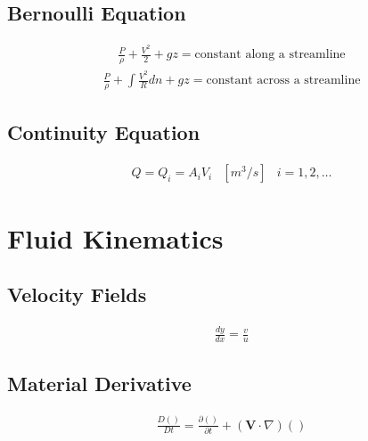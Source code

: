 \documentclass[a4paper]{amsart}
\begin{document}
\subsection{Bernoulli Equation}
\begin{eqnarray*}
	\frac{P}{\rho}+\frac{V^2}{2}+gz=\text{constant along a streamline}
\end{eqnarray*}
\begin{eqnarray*}
	\frac{P}{\rho}+\int\frac{V^2}{R}dn+gz=\text{constant across a streamline}
\end{eqnarray*}
\subsection{Continuity Equation}
\begin{eqnarray*}
	Q=Q_i=A_iV_i&[m^3/s]&i=1,2,\dots
\end{eqnarray*}


\section{Fluid Kinematics}
\subsection{Velocity Fields}
\begin{eqnarray*}
	\frac{dy}{dx}=\frac{v}{u}
\end{eqnarray*}
\subsection{Material Derivative}
\begin{eqnarray*}
	\frac{D( )}{Dt}=\frac{\partial ( )}{\partial t}+(\mathbf{V}\cdot\nabla)( )
\end{eqnarray*}
\end{document}
